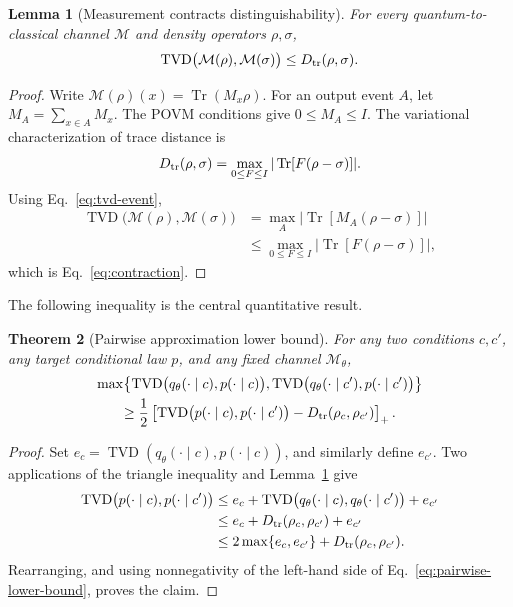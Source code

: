 \documentclass[11pt]{article}
\newtheorem{theorem}{Theorem}[section]
\newtheorem{lemma}[theorem]{Lemma}
\theoremstyle{definition}
\theoremstyle{remark}
\newcommand{\TVD}{\operatorname{TVD}}
\newcommand{\Tr}{\operatorname{Tr}}
\newcommand{\cM}{\mathcal{M}}
\begin{document}
\begin{lemma}[Measurement contracts distinguishability]
\label{lem:contraction}
For every quantum-to-classical channel $\cM$ and density operators
$\rho,\sigma$,
\begin{equation}
  \TVD\bigl(\cM(\rho),\cM(\sigma)\bigr)
  \leq D_{\rm tr}(\rho,\sigma).
  \label{eq:contraction}
\end{equation}
\end{lemma}

\begin{proof}
Write $\cM(\rho)(x)=\Tr(M_x\rho)$.  For an output event $A$, let
$M_A=\sum_{x\in A}M_x$.  The POVM conditions give $0\leq M_A\leq I$.
The variational characterization of trace distance is
\begin{equation}
 D_{\rm tr}(\rho,\sigma)
 =\max_{0\leq F\leq I}|\Tr[F(\rho-\sigma)]|.
 \label{eq:trace-variational}
\end{equation}
Using Eq.~\eqref{eq:tvd-event},
\begin{align}
 \TVD\bigl(\cM(\rho),\cM(\sigma)\bigr)
 &=\max_A |\Tr[M_A(\rho-\sigma)]| \\
 &\leq\max_{0\leq F\leq I}|\Tr[F(\rho-\sigma)]|,
\end{align}
which is Eq.~\eqref{eq:contraction}.
\end{proof}

The following inequality is the central quantitative result.

\begin{theorem}[Pairwise approximation lower bound]
\label{thm:pairwise}
For any two conditions $c,c'$, any target conditional law $p$, and any fixed
channel $\cM_\theta$,
\begin{multline}
 \max\!\left\{
  \TVD\bigl(q_\theta(\cdot\mid c),p(\cdot\mid c)\bigr),
  \TVD\bigl(q_\theta(\cdot\mid c'),p(\cdot\mid c')\bigr)
 \right\}\\
 \geq \frac12\left[
  \TVD\bigl(p(\cdot\mid c),p(\cdot\mid c')\bigr)
  -D_{\rm tr}(\rho_c,\rho_{c'})
 \right]_+.
 \label{eq:pairwise-lower-bound}
\end{multline}
\end{theorem}

\begin{proof}
Set $e_c=\TVD(q_\theta(\cdot\mid c),p(\cdot\mid c))$, and similarly
define $e_{c'}$.  Two applications of the triangle inequality and
Lemma~\ref{lem:contraction} give
\begin{align}
 \TVD\bigl(p(\cdot\mid c),p(\cdot\mid c')\bigr)
 &\leq e_c+
 \TVD\bigl(q_\theta(\cdot\mid c),q_\theta(\cdot\mid c')\bigr)+e_{c'}\\
 &\leq e_c+D_{\rm tr}(\rho_c,\rho_{c'})+e_{c'}\\
 &\leq 2\max\{e_c,e_{c'}\}+D_{\rm tr}(\rho_c,\rho_{c'}).
\end{align}
Rearranging, and using nonnegativity of the left-hand side of
Eq.~\eqref{eq:pairwise-lower-bound}, proves the claim.
\end{proof}
\end{document}
